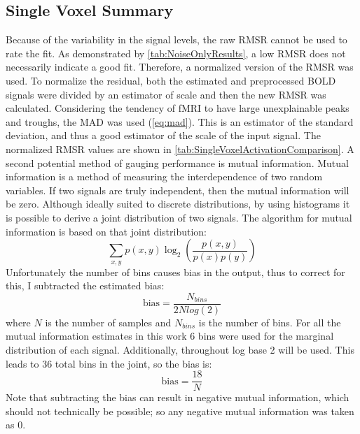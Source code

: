 \subsection{Single Voxel Summary}
\label{sec:SingleVoxelReview}
Because of the variability in the signal levels, the
raw \ac{RMSR} cannot be used to rate the fit. As demonstrated by \autoref{tab:NoiseOnlyResults},
a low \ac{RMSR} does not necessarily indicate a good fit.
Therefore, a normalized version of the \ac{RMSR} was used. To normalize the
residual, both the estimated and preprocessed \ac{BOLD} signals were divided by an estimator
of scale and then the new \ac{RMSR} was calculated.
Considering the tendency of \ac{fMRI} to have large unexplainable
peaks and troughs, the \ac{MAD} was used (\autoref{eq:mad}).
This is an estimator of the standard
deviation, and thus a good estimator of the scale of the input signal.
The normalized \ac{RMSR} values are
shown in \autoref{tab:SingleVoxelActivationComparison}. A second potential method of
gauging performance is mutual information. Mutual information is a method of measuring
the interdependence of two random variables. If two signals are truly independent,
then the mutual information will be zero. Although ideally suited to discrete
distributions, by using histograms
it is possible to derive a joint distribution of two signals. The algorithm for
mutual information is based on that joint distribution:
\begin{equation}
\sum_{x,y} p(x,y) \log_2\left(\frac{p(x,y)}{p(x)p(y)}\right)
\end{equation}
Unfortunately the number of bins causes bias in the output, thus to correct for this,
I subtracted the estimated bias:
\begin{equation}
\text{bias} = \frac{N_{bins}}{2Nlog(2)}
\end{equation}
where $N$ is the number of samples and $N_{bins}$ is the number of bins. For all
the mutual information estimates in this work 6 bins were used for the marginal
distribution of each signal. Additionally, throughout log base 2 will be used.
This leads to 36 total bins in the joint, so the bias is:
\begin{equation}
\text{bias} = \frac{18}{N}
\end{equation}
 Note that subtracting the bias can result in negative mutual
information, which should not technically be possible; so any negative mutual information
was taken as 0.

